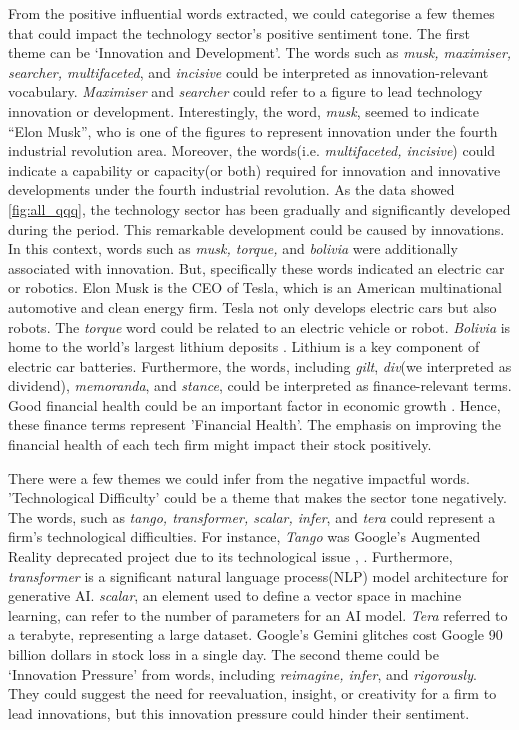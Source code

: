 \documentclass[logo,bsc,singlespacing,parskip]{infthesis}
\begin{document}
From the positive influential words extracted, we could categorise a few themes that could impact the technology sector’s positive sentiment tone. The first theme can be ‘Innovation and Development’. The words such as \textit{musk, maximiser, searcher, multifaceted}, and \textit{incisive} could be interpreted as innovation-relevant vocabulary. \textit{Maximiser} and \textit{searcher} could refer to a figure to lead technology innovation or development. Interestingly, the word, \textit{musk}, seemed to indicate “Elon Musk”, who is one of the figures to represent innovation under the fourth industrial revolution area. Moreover, the words(i.e. \textit{multifaceted, incisive}) could indicate a capability or capacity(or both) required for innovation and innovative developments under the fourth industrial revolution. As the data showed \ref{fig:all_qqq}, the technology sector has been gradually and significantly developed during the period. This remarkable development could be caused by innovations. In this context, words such as \textit{musk, torque,} and \textit{bolivia} were additionally associated with innovation. But, specifically these words indicated an electric car or robotics. Elon Musk is the CEO of Tesla, which is an American multinational automotive and clean energy firm. Tesla not only develops electric cars but also robots. The \textit{torque} word could be related to an electric vehicle or robot. \textit{Bolivia} is home to the world’s largest lithium deposits \cite{chan2023global}. Lithium is a key component of electric car batteries. Furthermore, the words, including \textit{gilt}, \textit{div}(we interpreted as dividend), \textit{memoranda}, and \textit{stance}, could be interpreted as finance-relevant terms. Good financial health could be an important factor in economic growth \cite{koijen2016financial}. Hence, these finance terms represent 'Financial Health'. The emphasis on improving the financial health of each tech firm might impact their stock positively. 

There were a few themes we could infer from the negative impactful words. 'Technological Difficulty' could be a theme that makes the sector tone negatively. The words, such as \textit{tango, transformer, scalar, infer}, and \textit{tera} could represent a firm’s technological difficulties. For instance, \textit{Tango} was Google’s Augmented Reality deprecated project due to its technological issue \cite{kastrenakes2017google}, \cite{donfro2017google}. Furthermore, \textit{transformer} is a significant natural language process(NLP) model architecture for generative AI. \textit{scalar}, an element used to define a vector space in machine learning, can refer to the number of parameters for an AI model. \textit{Tera} referred to a terabyte, representing a large dataset. Google’s Gemini glitches cost Google 90 billion dollars in stock loss in a single day. The second theme could be ‘Innovation Pressure’ from words, including \textit{reimagine, infer}, and \textit{rigorously}. They could suggest the need for reevaluation, insight, or creativity for a firm to lead innovations, but this innovation pressure could hinder their sentiment.
\end{document}
